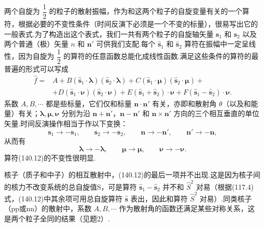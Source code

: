 两个自旋为 $\dfrac{1}{2}$ 的粒子的散射振幅，作为和这两个粒子的自旋变量有关的一个算符，根据必要的不变性条件（时间反演下必须是一个不变的标量），很易写出它的一般表式.为了构造出这个表式，我们一共有两个粒子的自旋轴矢量 $\boldsymbol{s}_1$ 和 $\boldsymbol{s}_2$ 以及两个普通（极）矢量 $n$ 和 $\boldsymbol{n}'$ 可供我们支配.每个 $\hat{\boldsymbol{s}}_1$ 和 $\hat{\boldsymbol{s}}_2$ 算符在振幅中一定呈线性，因为自旋为 $\dfrac{1}{2}$ 的算符的任意函数总能化成线性函数.满足这些条件的算符的最普遍的形式可以写成
\begin{equation}
\begin{aligned}
  \hat{f}={}&A+B\left(\hat{\boldsymbol{s}}_1\cdot\boldsymbol{\lambda}\right)
  \left(\hat{\boldsymbol{s}}_2\cdot\boldsymbol{\lambda}\right)
  +C\left(\hat{\boldsymbol{s}}_1\cdot\boldsymbol{\mu}\right)
  \left(\hat{\boldsymbol{s}}_2\cdot\boldsymbol{\mu}\right)+\\
  &+D\left(\hat{\boldsymbol{s}}_1\cdot\boldsymbol{\nu}\right)
  \left(\hat{\boldsymbol{s}}_2\cdot\boldsymbol{\nu}\right)
  +E\left(\hat{\boldsymbol{s}}_1+\hat{\boldsymbol{s}}_2\right)\cdot\boldsymbol{\nu}
  +F\left(\hat{\boldsymbol{s}}_1-\hat{\boldsymbol{s}}_2\right)\cdot\boldsymbol{\nu}.
\end{aligned}
\end{equation}
系数 $A,B,\cdots$ 都是些标量，它们仅和标量 $\boldsymbol{n}\cdot\boldsymbol{n}'$ 有关，亦即和散射角 $\theta$（以及和能量）有关；$\boldsymbol{\lambda},\boldsymbol{\mu},\boldsymbol{\nu}$ 分别为沿
$\boldsymbol{n}+\boldsymbol{n}'$，$\boldsymbol{n}-\boldsymbol{n}'$ 和
$\boldsymbol{n}\times\boldsymbol{n}'$ 方向的三个相互垂直的单位矢量.时间反演操作相当于作以下变换：
\begin{equation*}
  \boldsymbol{s}_1\to-\boldsymbol{s}_1,\qquad
  \boldsymbol{s}_2\to-\boldsymbol{s}_2,\qquad
  \boldsymbol{n}\to-\boldsymbol{n}',\qquad
  \boldsymbol{n}'\to-\boldsymbol{n},
\end{equation*}
从而有
\begin{equation*}
  \boldsymbol{\lambda}\to-\boldsymbol{\lambda},\qquad
  \boldsymbol{\mu}\to\boldsymbol{\mu},\qquad
  \boldsymbol{\nu}\to-\boldsymbol{\nu}.
\end{equation*}
算符(140.12)的不变性很明显.

核子（质子和中子）的相互散射中，(140.12)的最后一项并不出现.这是因为核子间的核力不改变系统的总自旋值S，可是算符
$\hat{\boldsymbol{s}}_1-\hat{\boldsymbol{s}}_2$ 并不和 $\hat{S}^2$ 对易（根据(117.4)式，(140.12)中其余项可用总自旋算符 $\hat{\boldsymbol{s}}$ 表出，因此和算符 $\hat{S}^2$ 对易）.同类核子（pp或nn）的散射中，系数 $A,B,\cdots$ 作为散射角的函数还满足某些对称关系，这是两个粒子全同的结果（见题2）.

